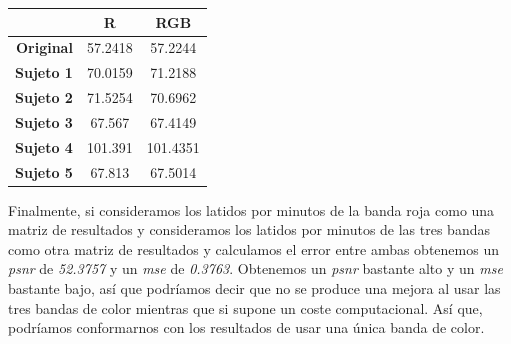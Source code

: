 \documentclass[11pt]{article}
\begin{document}
\begin{table}[H]
	\centering
	\begin{tabular}{rcc}
		\textbf{} & \textbf{R} & \textbf{RGB} \\ \hline
		\textbf{Original} & 57.2418 & 57.2244 \\
		\textbf{Sujeto 1} & 70.0159 & 71.2188 \\
		\textbf{Sujeto 2} & 71.5254 & 70.6962 \\
		\textbf{Sujeto 3} & 67.567 & 67.4149 \\
		\textbf{Sujeto 4} & 101.391 & 101.4351 \\
		\textbf{Sujeto 5} & 67.813 & 67.5014
	\end{tabular}
\end{table}

Finalmente, si consideramos los latidos por minutos de la banda roja como una matriz de resultados y consideramos los latidos por minutos de las tres bandas como otra matriz de resultados y calculamos el error entre ambas obtenemos un \textit{psnr} de \textit{52.3757} y un \textit{mse} de \textit{0.3763}. Obtenemos un \textit{psnr} bastante alto y un \textit{mse} bastante bajo, así que podríamos decir que no se produce una mejora al usar las tres bandas de color mientras que si supone un coste computacional. Así que, podríamos conformarnos con los resultados de usar una única banda de color.
\end{document}
